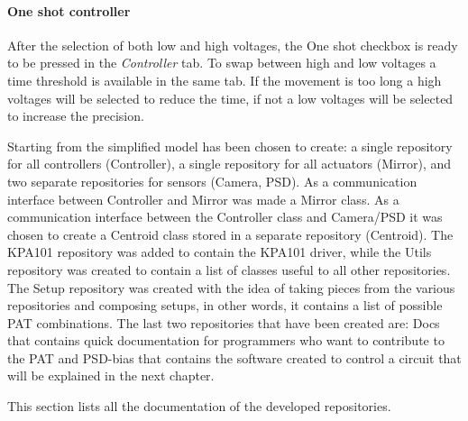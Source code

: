 \paragraph{One shot controller}

After the selection of both low and high voltages, the One shot checkbox is ready to be pressed in the \emph{Controller} tab. To
swap between high and low voltages a time threshold is available in the same tab. If the movement is too long a high voltages will be selected to reduce the time, if not a low voltages will be selected to increase the precision.

Starting from the simplified model  has been chosen to create: a single repository for all controllers (Controller), a single repository for all actuators (Mirror), and two separate repositories for sensors (Camera, PSD).
As a communication interface between Controller and Mirror was made a Mirror class. As a communication interface between the Controller class and Camera/PSD it was chosen to create a Centroid class stored in a separate repository (Centroid).
The KPA101 repository was added to contain the KPA101 driver, while the Utils repository was created to contain a list of classes useful to all other repositories.
The Setup repository was created with the idea of taking pieces from the various repositories and composing setups, in other words, it contains a list of possible PAT combinations.
The last two repositories that have been created are: Docs that contains quick documentation for programmers who want to contribute to the PAT and PSD-bias that contains the software created to control a circuit that will be explained in the next chapter.

This section lists all the documentation of the developed repositories.

  {\parindent0pt
    
    
    
    
    
    
    
    
  }
